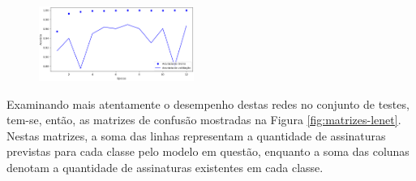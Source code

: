 \begin{figure}[h!]
{	\includegraphics[width=0.45\textwidth]{imgs/lenet-c-acc}
	}
	\hfill
	\label{fig:treinamento-lenet}
\end{figure}

Examinando mais atentamente o desempenho destas redes no conjunto de testes, tem-se, então, as matrizes de confusão mostradas na Figura \ref{fig:matrizes-lenet}. Nestas matrizes, a soma das linhas representam a quantidade de assinaturas previstas para cada classe pelo modelo em questão, enquanto a soma das colunas denotam a quantidade de assinaturas existentes em cada classe.

